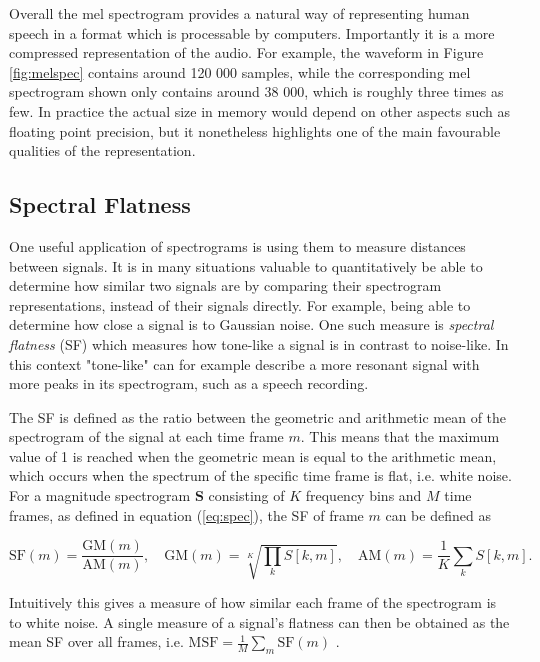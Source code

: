 \documentclass{report}
\begin{document}
Overall the mel spectrogram provides a natural way of representing human speech in a format which is processable by computers. Importantly it is a more compressed representation of the audio. For example, the waveform in Figure \ref{fig:melspec} contains around 120 000 samples, while the corresponding mel spectrogram shown only contains around 38 000, which is roughly three times as few. In practice the actual size in memory would depend on other aspects such as floating point precision, but it nonetheless highlights one of the main favourable qualities of the representation.

\subsection{Spectral Flatness} \label{sec:msf}
One useful application of spectrograms is using them to measure distances between signals. It is in many situations valuable to quantitatively be able to determine how similar two signals are by comparing their spectrogram representations, instead of their signals directly. For example, being able to determine how close a signal is to Gaussian noise. One such measure is \textit{spectral flatness} (SF) which measures how tone-like a signal is in contrast to noise-like. In this context "tone-like" can for example describe a more resonant signal with more peaks in its spectrogram, such as a speech recording.

The SF is defined as the ratio between the geometric and arithmetic mean of the spectrogram of the signal at each time frame $m$. This means that the maximum value of 1 is reached when the geometric mean is equal to the arithmetic mean, which occurs when the spectrum of the specific time frame is flat, i.e. white noise. For a magnitude spectrogram $\bm{S}$ consisting of $K$ frequency bins and $M$ time frames, as defined in equation (\ref{eq:spec}), the SF of frame $m$ can be defined as

\begin{equation}
    \text{SF}(m) = \frac{\text{GM}(m)}{\text{AM}(m)}, \quad \text{GM}(m) = \sqrt[K]{\prod_{k} S[k, m]}, \quad \text{AM}(m) = \frac{1}{K} \sum_k S[k, m].
\end{equation}

Intuitively this gives a measure of how similar each frame of the spectrogram is to white noise. A single measure of a signal's flatness can then be obtained as the mean SF over all frames, i.e. $\text{MSF} = \frac{1}{M} \sum_m \text{SF}(m)$ \cite{ma2013efficient, dubnov2004generalization}.
\end{document}
